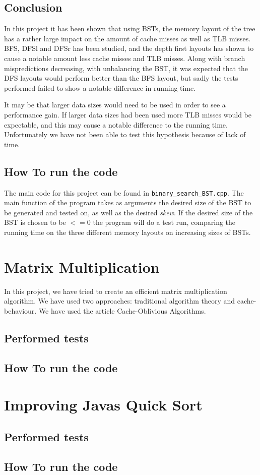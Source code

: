 \documentclass{article}
\begin{document}
\subsection{Conclusion}
In this project it has been shown that using BSTs, the memory layout of the tree has a rather large impact on the amount of cache misses as well as TLB misses. BFS, DFSl and DFSr has been studied, and the depth first layouts has shown to cause a notable amount less cache misses and TLB misses. Along with branch mispredictions decreasing, with unbalancing the BST, it was expected that the DFS layouts would perform better than the BFS layout, but sadly the tests performed failed to show a notable difference in running time.

It may be that larger data sizes would need to be used in order to see a performance gain. If larger data sizes had been used more TLB misses would be expectable, and this may cause a notable difference to the running time. Unfortunately we have not been able to test this hypothesis because of lack of time. 

\subsection{How To run the code}
The main code for this project can be found in \texttt{binary\_search\_BST.cpp}. The main function of the program takes as arguments the desired size of the BST to be generated and tested on, as well as the desired \textit{skew}. If the desired size of the BST is chosen to be $<=0$ the program will do a test run, comparing the running time on the three different memory layouts on increasing sizes of BSTs.

\section{Matrix Multiplication}
In this project, we have tried to create an efficient matrix multiplication algorithm. We have used two approaches: traditional algorithm theory and cache-behaviour. We have used the article Cache-Oblivious Algorithms\cite{frigo-cache}.
\subsection{Performed tests}
\subsection{How To run the code}

\section{Improving Javas Quick Sort}
\subsection{Performed tests}
\subsection{How To run the code}



\end{document}
